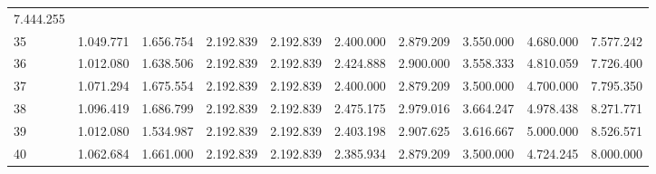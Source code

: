 \begin{tabular}{llllllllll}
  \multicolumn{1}{r}{7.444.255} \\
\multicolumn{1}{l}{\hspace{1em}35} &
  \multicolumn{1}{|r}{1.049.771} &
  \multicolumn{1}{r}{1.656.754} &
  \multicolumn{1}{r}{2.192.839} &
  \multicolumn{1}{r}{2.192.839} &
  \multicolumn{1}{r}{2.400.000} &
  \multicolumn{1}{r}{2.879.209} &
  \multicolumn{1}{r}{3.550.000} &
  \multicolumn{1}{r}{4.680.000} &
  \multicolumn{1}{r}{7.577.242} \\
\multicolumn{1}{l}{\hspace{1em}36} &
  \multicolumn{1}{|r}{1.012.080} &
  \multicolumn{1}{r}{1.638.506} &
  \multicolumn{1}{r}{2.192.839} &
  \multicolumn{1}{r}{2.192.839} &
  \multicolumn{1}{r}{2.424.888} &
  \multicolumn{1}{r}{2.900.000} &
  \multicolumn{1}{r}{3.558.333} &
  \multicolumn{1}{r}{4.810.059} &
  \multicolumn{1}{r}{7.726.400} \\
\multicolumn{1}{l}{\hspace{1em}37} &
  \multicolumn{1}{|r}{1.071.294} &
  \multicolumn{1}{r}{1.675.554} &
  \multicolumn{1}{r}{2.192.839} &
  \multicolumn{1}{r}{2.192.839} &
  \multicolumn{1}{r}{2.400.000} &
  \multicolumn{1}{r}{2.879.209} &
  \multicolumn{1}{r}{3.500.000} &
  \multicolumn{1}{r}{4.700.000} &
  \multicolumn{1}{r}{7.795.350} \\
\multicolumn{1}{l}{\hspace{1em}38} &
  \multicolumn{1}{|r}{1.096.419} &
  \multicolumn{1}{r}{1.686.799} &
  \multicolumn{1}{r}{2.192.839} &
  \multicolumn{1}{r}{2.192.839} &
  \multicolumn{1}{r}{2.475.175} &
  \multicolumn{1}{r}{2.979.016} &
  \multicolumn{1}{r}{3.664.247} &
  \multicolumn{1}{r}{4.978.438} &
  \multicolumn{1}{r}{8.271.771} \\
\multicolumn{1}{l}{\hspace{1em}39} &
  \multicolumn{1}{|r}{1.012.080} &
  \multicolumn{1}{r}{1.534.987} &
  \multicolumn{1}{r}{2.192.839} &
  \multicolumn{1}{r}{2.192.839} &
  \multicolumn{1}{r}{2.403.198} &
  \multicolumn{1}{r}{2.907.625} &
  \multicolumn{1}{r}{3.616.667} &
  \multicolumn{1}{r}{5.000.000} &
  \multicolumn{1}{r}{8.526.571} \\
\multicolumn{1}{l}{\hspace{1em}40} &
  \multicolumn{1}{|r}{1.062.684} &
  \multicolumn{1}{r}{1.661.000} &
  \multicolumn{1}{r}{2.192.839} &
  \multicolumn{1}{r}{2.192.839} &
  \multicolumn{1}{r}{2.385.934} &
  \multicolumn{1}{r}{2.879.209} &
  \multicolumn{1}{r}{3.500.000} &
  \multicolumn{1}{r}{4.724.245} &
  \multicolumn{1}{r}{8.000.000} \\

\end{tabular}
